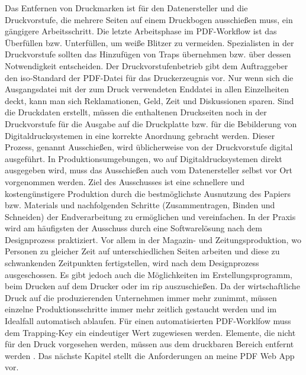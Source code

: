 Das Entfernen von Druckmarken ist für den Datenersteller und die Druckvorstufe, die mehrere Seiten auf einem Druckbogen ausschießen muss, ein gängigere Arbeitsschritt. Die letzte Arbeitsphase im PDF-Workflow ist das Überfüllen bzw. Unterfüllen, um weiße Blitzer zu vermeiden. Spezialisten in der Druckvorstufe sollten das Hinzufügen von Traps übernehmen bzw. über dessen Notwendigkeit entscheiden. Der Druckvorstufenbetrieb gibt dem Auftraggeber den \gls{iso}-Standard der PDF-Datei für das Druckerzeugnis vor. Nur wenn sich die Ausgangsdatei mit der zum Druck verwendeten Enddatei in allen Einzelheiten deckt, kann man sich Reklamationen, Geld, Zeit und Diskussionen sparen. Sind die Druckdaten erstellt, müssen die enthaltenen Druckseiten noch in der Druckvorstufe für die Ausgabe auf die Druckplatte bzw. für die Bebilderung von Digitaldrucksystemen in eine korrekte Anordnung gebracht werden. Dieser Prozess, genannt Ausschießen, wird üblicherweise von der Druckvorstufe digital ausgeführt. In Produktionsumgebungen, wo auf Digitaldrucksystemen direkt ausgegeben wird, muss das Ausschießen auch vom Datenersteller selbst vor Ort vorgenommen werden. Ziel des Ausschusses ist eine schnellere und kostengünstigere Produktion durch die bestmöglichste Ausnutzung des Papiers bzw. Materials und nachfolgenden Schritte (Zusammentragen, Binden und Schneiden) der Endverarbeitung zu ermöglichen und vereinfachen. In der Praxis wird am häufigsten der Ausschuss durch eine Softwarelösung nach dem Designprozess praktiziert. Vor allem in der Magazin- und Zeitungsproduktion, wo Personen zu gleicher Zeit auf unterschiedlichen Seiten arbeiten und diese zu schwankenden Zeitpunkten fertigstellen, wird nach dem Designprozess ausgeschossen. Es gibt jedoch auch die Möglichkeiten im Erstellungsprogramm, beim Drucken auf dem Drucker oder im \gls{rip} auszuschießen. Da der wirtschaftliche Druck auf die produzierenden Unternehmen immer mehr zunimmt, müssen einzelne Produktionsschritte immer mehr zeitlich gestaucht werden und im Idealfall automatisch ablaufen. Für einen automatisierten PDF-Worklfow muss dem Trapping-Key ein eindeutiger Wert zugewiesen werden. Elemente, die nicht für den Druck vorgesehen werden, müssen aus dem druckbaren Bereich entfernt werden \cite{schneeberger}. Das nächste Kapitel stellt die Anforderungen an meine PDF Web App vor.